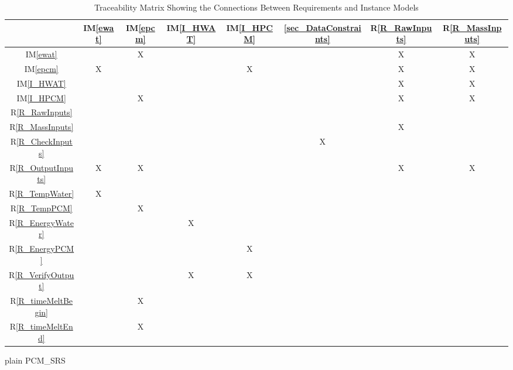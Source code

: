 \documentclass[12pt]{article}
\newcommand{\iref}[1]{IM\ref{#1}}
\newcommand{\rref}[1]{R\ref{#1}}
\begin{document}
\begin{table}[h!]
\centering
\begin{tabular}{|c|c|c|c|c|c|c|c|}
\hline
	& \iref{ewat}& \iref{epcm}& \iref{I_HWAT}& \iref{I_HPCM}& \ref{sec_DataConstraints}& \rref{R_RawInputs}& \rref{R_MassInputs} \\
\hline
\iref{ewat}            & & X& & & & X& X \\ \hline
\iref{epcm}            & X& & & X& & X& X \\ \hline
\iref{I_HWAT}          & & & & & & X& X \\ \hline
\iref{I_HPCM}          & & X& & & & X& X \\ \hline
\rref{R_RawInputs}     & & & & & & & \\ \hline
\rref{R_MassInputs}    & & & & & & X& \\ \hline
\rref{R_CheckInputs}   & & & & & X& & \\ \hline
\rref{R_OutputInputs}  & X& X& & & & X& X \\ \hline
\rref{R_TempWater}     & X& & & & & & \\ \hline 
\rref{R_TempPCM}       & & X& & & & & \\ \hline
\rref{R_EnergyWater}   & & & X& & & & \\ \hline
\rref{R_EnergyPCM}     & & & & X& & & \\ \hline
\rref{R_VerifyOutput}  & & & X& X& & & \\ \hline
\rref{R_timeMeltBegin} & & X& & & & & \\ \hline
\rref{R_timeMeltEnd}   & & X& & & & & \\ 
\hline
\end{tabular}
\caption{Traceability Matrix Showing the Connections Between Requirements and Instance Models}
\label{Table:R_trace}
\end{table}

 {plain}
 {PCM_SRS}
\end{document}
